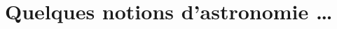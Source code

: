 \documentclass[11pt]{book} %
\begin{document}
\usechapterimagefalse%


\pagestyle{empty} %

\tableofcontents %

\cleardoublepage%

\pagestyle{fancy} %





\chapter{Quelques notions d'astronomie \ldots}
\end{document}
